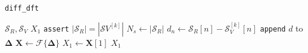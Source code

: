 \begin{algorithm}[h]
  \caption{\texttt{diff\_dft}}
  \begin{spacing}{1.3}
    \begin{algorithmic}[1]
      \REQUIRE $\mathcal{S}_R, \mathcal{S}_V$
      \ENSURE $X_1$
      \STATE \texttt{assert} $|\mathcal{S}_R| = |\mathcal{S}V^{[k]}|$
      \STATE $N_s \leftarrow |\mathcal{S}_R|$
      \STATE {$\bm{\Delta} \leftarrow \{\varnothing\}$}
      \STATE $d_n \leftarrow \mathcal{S}_R[n] - \mathcal{S}_V^{[k]}[n]$
      \STATE \texttt{append} $d$ to $\bm{\Delta}$
      \ENDFOR
      \STATE $\bm{X} \leftarrow \mathcal{F}\{\bm{\Delta}\}$
      \STATE $X_1 \leftarrow \bm{X}[1]$
      \RETURN $X_1$
    \end{algorithmic}
  \end{spacing}
  \label{alg:diff_dft}
\end{algorithm}

